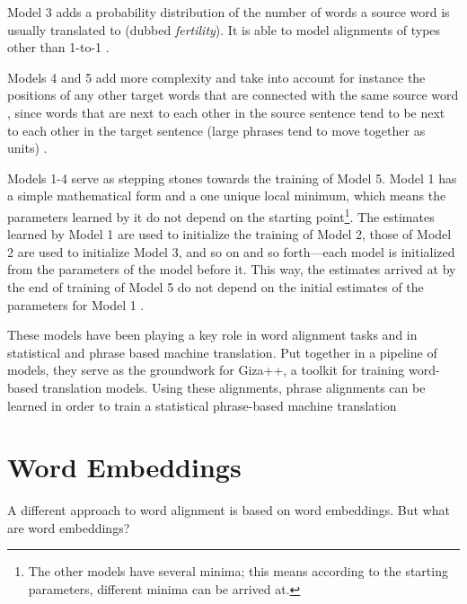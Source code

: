 Model 3 adds a probability distribution of the number of words a source word is usually translated to (dubbed \emph{fertility}). 
It is able to model alignments of types other than 1-to-1 \autocite[100]{koehn2009}. 

Models 4 and 5 add more complexity and take into account for instance the positions of any other target words that are connected with the same source word \autocite{brown-etal-1993-mathematics}, since words that are next to each other in the source sentence tend to be next to each other in the target sentence (large phrases tend to move together as units) \autocite[107]{koehn2009}.

Models 1-4 serve as stepping stones towards the training of Model 5. 
Model 1 has a simple mathematical form and a one unique local minimum, which means the parameters learned by it do not depend on the starting point\footnote{The other models have several minima; this means according to the starting parameters, different minima can be arrived at.}. 
The estimates learned by Model 1 are used to initialize the training of Model 2, those of Model 2 are used to initialize Model 3, and so on and so forth---each model is initialized from the parameters of the model before it. 
This way, the estimates arrived at by the end of training of Model 5 do not depend  on the initial estimates of the parameters for Model 1 \autocite{brown-etal-1993-mathematics}. 

These models have been playing a key role in word alignment tasks and in statistical and phrase based machine translation. 
Put together in a pipeline of models, they serve as the groundwork for Giza++, a toolkit for training word-based translation models. 
Using these alignments, phrase alignments can be learned in order to train a statistical phrase-based machine translation \autocites{och-ney-2000-improved,och-ney-2003-smt}




\section{Word Embeddings}
\label{sec:word-embeddings}
A different approach to word alignment is based on word embeddings. 
But what are word embeddings?
 

